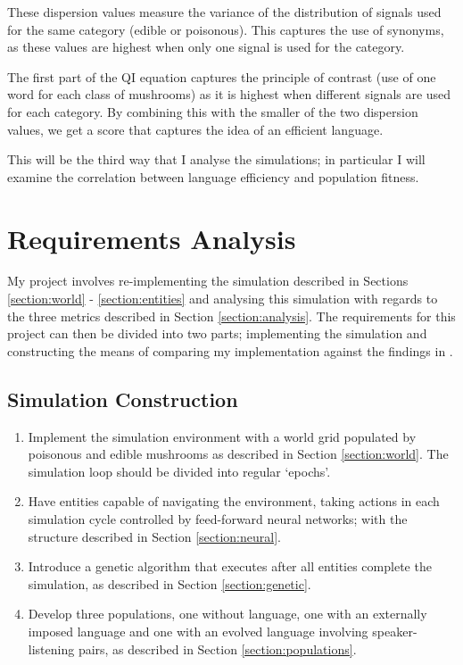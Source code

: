 \documentclass[12pt,a4paper]{report}
\begin{document}
These dispersion values measure the variance of the distribution of signals used for the same category (edible or poisonous). This captures the use of synonyms, as these values are highest when only one signal is used for the category. 

The first part of the QI equation captures the principle of contrast (use of one word for each class of mushrooms) as it is highest when different signals are used for each category. By combining this with the smaller of the two dispersion values, we get a score that captures the idea of an efficient language.

This will be the third way that I analyse the simulations; in particular I will examine the correlation between language efficiency and population fitness.


\section{Requirements Analysis}\label{section:requirements}

My project involves re-implementing the simulation described in Sections \ref{section:world} - \ref{section:entities} and analysing this simulation with regards to the three metrics described in Section \ref{section:analysis}. The requirements for this project can then be divided into two parts; implementing the simulation and constructing the means of comparing my implementation against the findings in \citet{Cangelosi1998}.

\subsection*{Simulation Construction}

\begin{enumerate}

\item Implement the simulation environment with a world grid populated by poisonous and edible mushrooms as described in Section \ref{section:world}. The simulation loop should be divided into regular `epochs'.

\item Have entities capable of navigating the environment, taking actions in each simulation cycle controlled by feed-forward neural networks; with the structure described in Section \ref{section:neural}.

\item Introduce a genetic algorithm that executes after all entities complete the simulation, as described in Section \ref{section:genetic}.

\item Develop three populations, one without language, one with an externally imposed language and one with an evolved language involving speaker-listening pairs, as described in Section \ref{section:populations}.

\end{enumerate}
\end{document}
